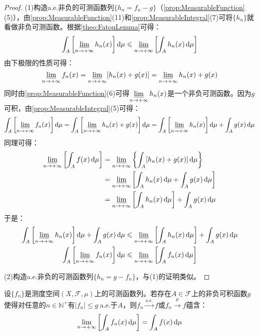 \begin{proof}
	(1)构造a.e.非负的可测函数列$\{h_n=f_n-g\}$（\cref{prop:MeasurableFunction}(5)），由\cref{prop:MeasurableFunction}(11)和\cref{prop:MeasurableIntegral}(7)可将$\{h_n\}$就看做非负可测函数。根据\cref{theo:FatouLemma}可得：
	\begin{equation*}
		\int_{A}\left[\varliminf_{n\to+\infty}h_n(x)\right]\mathop{}\!\mathrm{d}\mu\leqslant\varliminf_{n\to+\infty}\left[\int_{A}h_n(x)\mathop{}\!\mathrm{d}\mu\right]
	\end{equation*}
	由下极限的性质可得：
	\begin{equation*}
		\varliminf_{n\to+\infty}f_n(x)=\varliminf_{n\to+\infty}[h_n(x)+g(x)]=\varliminf_{n\to+\infty}h_n(x)+g(x)
	\end{equation*}
	同时由\cref{prop:MeasurableFunction}(6)可得$\varliminf\limits_{n\to+\infty}h_n(x)$是一个非负可测函数。因为$g$可积，由\cref{prop:MeasurableIntegral}(5)可得：
	\begin{equation*}
		\int_{A}\left[\varliminf_{n\to+\infty}f_n(x)\right]\mathop{}\!\mathrm{d}\mu=\int_{A}\left[\varliminf_{n\to+\infty}h_n(x)+g(x)\right]\mathop{}\!\mathrm{d}\mu=\int_{A}\left[\varliminf_{n\to+\infty}h_n(x)\right]\mathop{}\!\mathrm{d}\mu+\int_{A}g(x)\mathop{}\!\mathrm{d}\mu
	\end{equation*}
	同理可得：
	\begin{align*}
		\varliminf_{n\to+\infty}\left[\int_{A}f(x)\mathop{}\!\mathrm{d}\mu\right]&=\varliminf_{n\to+\infty}\left\{\int_{A}[h_n(x)+g(x)]\mathop{}\!\mathrm{d}\mu\right\} \\
		&=\varliminf_{n\to+\infty}\left[\int_{A}h_n(x)\mathop{}\!\mathrm{d}\mu+\int_{A}g(x)\mathop{}\!\mathrm{d}\mu\right] \\
		&=\varliminf_{n\to+\infty}\left[\int_{A}h_n(x)\mathop{}\!\mathrm{d}\mu\right]+\int_{A}g(x)\mathop{}\!\mathrm{d}\mu
	\end{align*}
	于是：
	\begin{gather*}
		\int_{A}\left[\varliminf_{n\to+\infty}h_n(x)\right]\mathop{}\!\mathrm{d}\mu+\int_{A}g(x)\mathop{}\!\mathrm{d}\mu\leqslant\varliminf_{n\to+\infty}\left[\int_{A}h_n(x)\mathop{}\!\mathrm{d}\mu\right]+\int_{A}g(x)\mathop{}\!\mathrm{d}\mu \\
		\int_{A}\left[\varliminf_{n\to+\infty}f_n(x)\right]\mathop{}\!\mathrm{d}\mu\leqslant\varliminf_{n\to+\infty}\left[\int_{A}f_n(x)\mathop{}\!\mathrm{d}\mu\right]
	\end{gather*}\par
	(2)构造a.e.非负的可测函数列$\{h_n=g-f_n\}$，与(1)的证明类似。
\end{proof}
\begin{theorem}[Lebesgue控制收敛定理]\label{theo:DominatedConvergenceTheorem}
	设$\{f_n\}$是测度空间$(X,\mathscr{F},\mu)$上的可测函数列。若存在$A\in\mathscr{F}$上的非负可积函数$g$使得对任意的$n\in\mathbb{N}^+$有$|f_n|\leqslant g\;$a.e.于$A$，则$f_n\overset{\text{a.e.}}{\longrightarrow}f$或$f_n\overset{\mu}{\longrightarrow}f$蕴含：
	\begin{equation*}
		\lim_{n\to+\infty}\left[\int_{A}f_n(x)\mathop{}\!\mathrm{d}\mu\right]=\int_{A}f(x)\mathop{}\!\mathrm{d}\mu
	\end{equation*}
\end{theorem}
